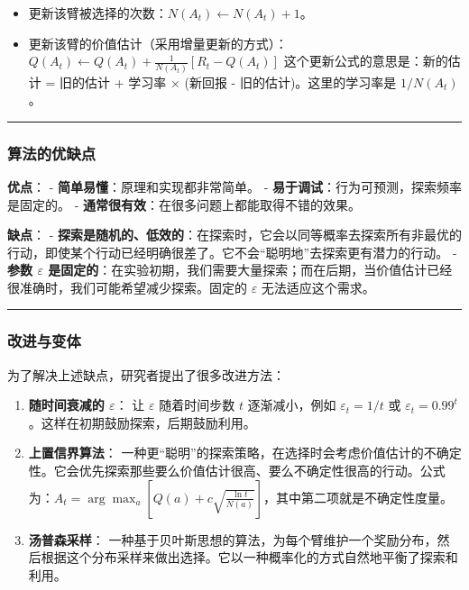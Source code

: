 \documentclass[11pt]{ctexart}
\providecommand{\tightlist}{%
      \setlength{\itemsep}{0pt}\setlength{\parskip}{0pt}}
\begin{document}
\begin{enumerate}
\begin{enumerate}
    \begin{itemize}
    \tightlist
    \item
      更新该臂被选择的次数：\(N(A_t) \leftarrow N(A_t) + 1\)。
    \item
      更新该臂的价值估计（采用增量更新的方式）：
      \(Q(A_t) \leftarrow Q(A_t) + \frac{1}{N(A_t)} [R_t - Q(A_t)]\)
      这个更新公式的意思是：新的估计 = 旧的估计 + 学习率 × (新回报 -
      旧的估计)。这里的学习率是 \(1/N(A_t)\)。
    \end{itemize}
  \end{enumerate}
\end{enumerate}

\begin{center}\rule{0.5\linewidth}{0.5pt}\end{center}

\hypertarget{ux7b97ux6cd5ux7684ux4f18ux7f3aux70b9}{%
\subsubsection{算法的优缺点}\label{ux7b97ux6cd5ux7684ux4f18ux7f3aux70b9}}

\textbf{优点}： - \textbf{简单易懂}：原理和实现都非常简单。 -
\textbf{易于调试}：行为可预测，探索频率是固定的。 -
\textbf{通常很有效}：在很多问题上都能取得不错的效果。

\textbf{缺点}： -
\textbf{探索是随机的、低效的}：在探索时，它会以同等概率去探索所有非最优的行动，即使某个行动已经明确很差了。它不会``聪明地''去探索更有潜力的行动。
- \textbf{参数 \(\varepsilon\)
是固定的}：在实验初期，我们需要大量探索；而在后期，当价值估计已经很准确时，我们可能希望减少探索。固定的
\(\varepsilon\) 无法适应这个需求。

\begin{center}\rule{0.5\linewidth}{0.5pt}\end{center}

\hypertarget{ux6539ux8fdbux4e0eux53d8ux4f53}{%
\subsubsection{改进与变体}\label{ux6539ux8fdbux4e0eux53d8ux4f53}}

为了解决上述缺点，研究者提出了很多改进方法：

\begin{enumerate}
\def\labelenumi{\arabic{enumi}.}
\item
  \textbf{随时间衰减的 \(\varepsilon\)}： 让 \(\varepsilon\)
  随着时间步数 \(t\) 逐渐减小，例如 \(\varepsilon_t = 1/t\) 或
  \(\varepsilon_t = 0.99^t\)。这样在初期鼓励探索，后期鼓励利用。
\item
  \textbf{上置信界算法}：
  一种更``聪明''的探索策略，在选择时会考虑价值估计的不确定性。它会优先探索那些要么价值估计很高、要么不确定性很高的行动。公式为：\(A_t = \arg\max_a [Q(a) + c \sqrt{\frac{\ln t}{N(a)}}]\)，其中第二项就是不确定性度量。
\item
  \textbf{汤普森采样}：
  一种基于贝叶斯思想的算法，为每个臂维护一个奖励分布，然后根据这个分布采样来做出选择。它以一种概率化的方式自然地平衡了探索和利用。
\end{enumerate}
\end{document}
